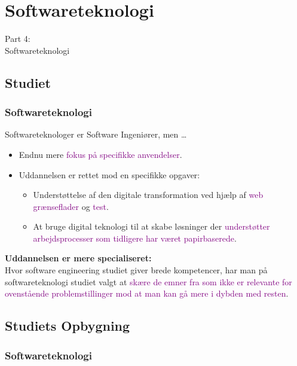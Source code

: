 {
\renewcommand{\bgcolor}{st}

\section{Softwareteknologi}
\begin{frame}
    \vspace{25mm}
    \begin{center}
        \Huge{Part 4:\\Softwareteknologi}
    \end{center}
\end{frame}

\subsection{Studiet}
\begin{frame}[fragile]
  \frametitle{Softwareteknologi }
  \vspace{3mm}
  Softwareteknologer er Software Ingeniører, men \ldots
  \begin{itemize}
    \item Endnu mere \textcolor{purple}{fokus på specifikke anvendelser}.
    \item Uddannelsen er rettet mod en specifikke opgaver:
      \begin{itemize}
        \item Understøttelse af den digitale transformation ved hjælp af \textcolor{purple}{web grænseflader} og \textcolor{purple}{test}.
        \item At bruge digital teknologi til at skabe løsninger der \textcolor{purple}{understøtter arbejdsprocesser som tidligere har været papirbaserede}.
      \end{itemize}
  \end{itemize}
  
  \pause
  \vspace{5mm}
  \textbf{Uddannelsen er mere specialiseret:} \\
  Hvor software engineering studiet giver brede kompetencer, har man på softwareteknologi studiet valgt at \textcolor{purple}{skære de emner fra som ikke er relevante for ovenstående problemstillinger mod at man kan gå mere i dybden med resten}.
\end{frame}

\subsection{Studiets Opbygning}
\begin{frame}[fragile]
  \frametitle{Softwareteknologi }
  \vspace{-2mm}
  

\end{frame}}

